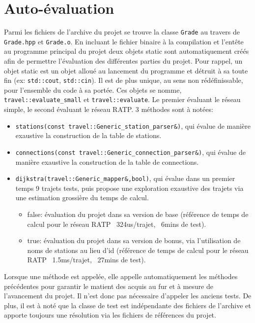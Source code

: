 \documentclass[9pts]{article}
\begin{document}
\section{Auto-évaluation}
\label{sec::autoeval}
Parmi les fichiers de l'archive du projet se trouve la classe \texttt{Grade} au travers de \texttt{Grade.hpp} et \texttt{Grade.o}.
En incluant le fichier binaire à la compilation et l'entête au programme principal du projet deux objets static sont automatiquement créés afin de permettre l'évaluation des différentes parties du projet.
Pour rappel, un objet static est un objet alloué au lancement du programme et détruit à sa toute fin (ex: \texttt{std::cout}, \texttt{std::cin}). Il est de plus unique, au sens non rédéfinissable, pour l'ensemble du code à sa portée.
Ces objets se nomme, \texttt{travel::evaluate\_small} et \texttt{travel::evaluate}.
Le premier évaluant le réseau simple, le second évaluant le réseau RATP.
3 méthodes sont à notées:
\begin{itemize}
  \item \texttt{stations(const travel::Generic\_station\_parser\&)}, qui évalue de manière exaustive la construction de la table de stations.
  \item \texttt{connections(const travel::Generic\_connection\_parser\&)}, qui évalue de manière exaustive la construction de la table de connections.
  \item \texttt{dijkstra(travel::Generic\_mapper\&,bool)}, qui évalue dans un premier temps 9 trajets tests, puis propose une exploration exaustive des trajets via une estimation grossière du temps de calcul.
    \begin{itemize}
      \item false: évaluation du projet dans sa version de base (référence de temps de calcul pour le réseau RATP ~324us/trajet, ~6mins de test).
      \item true: évaluation du projet dans sa version de bonus, via l'utilisation de noms de stations au lieu d'id (référence de temps de calcul pour le réseau RATP ~1.5ms/trajet, ~27mins de test).
    \end{itemize}
\end{itemize}
Lorsque une méthode est appelée, elle appelle automatiquement les méthodes précédentes pour garantir le matient des acquis au fur et à mesure de l'avancement du projet.
Il n'est donc pas nécessaire d'appeler les anciens tests.
De plus, il est à noté que la classe de test est indépendante des fichiers de l'archive et apporte toujours une résolution via les fichiers de références du projet.
\end{document}
